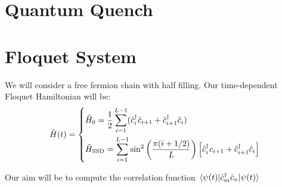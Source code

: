 \documentclass[11pt, a4paper]{article}
\theoremstyle{definition} %
\begin{document}
\section{Quantum Quench}





\section{Floquet System}

We will consider a free fermion chain with half filling. Our time-dependent Floquet Hamiltonian will be:
	\begin{equation}
	\hat{H}(t) = 
		\begin{dcases}
		\hat{H}_0 = \frac{1}{2} \sum_{i=1}^{L-1} (\hat{c}_i^\dagger \hat{c}_{i+1} + \hat{c}_{i+1}^\dagger \hat{c}_{i})\\
		\hat{H}_\text{SSD} = \sum_{i=1}^{L-1} \sin^2\left( \frac{\pi(i + 1/2)}{L}\right) \left[ \hat{c}_i^\dagger c_{i+1} + \hat{c}_{i+1}^\dagger \hat{c}_i \right]
		\end{dcases}
	\end{equation}

Our aim will be to compute the correlation function $\mel{\psi(t)}{\hat{c}_m^\dagger \hat{c}_n}{\psi(t)}$
\end{document}
